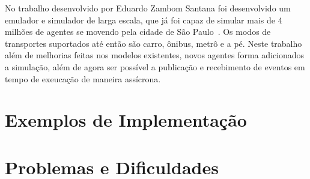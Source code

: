 No trabalho desenvolvido por Eduardo Zambom Santana foi desenvolvido um emulador e simulador de larga escala, que já foi capaz de simular mais de 4 milhões de
agentes se movendo pela cidade de São Paulo~\cite{santana_17}.
Os modos de transportes suportados até então são carro, ônibus, metrô e a pé.
Neste trabalho além de melhorias feitas nos modelos existentes, novos agentes forma adicionados a simulação, além de agora ser possível a publicação e recebimento de
eventos em tempo de exeucação de maneira assícrona.

\section{Exemplos de Implementação}
\section{Problemas e Dificuldades}
